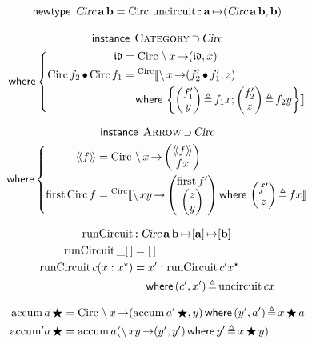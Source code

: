 \documentclass[a5paper,twoside,fleqn,draft]{jsbook}
\def\[{[\![}
\def\]{]\!]}
\newcommand{\Langle}{\langle\!\langle}
\newcommand{\Rangle}{\rangle\!\rangle}
\newcommand{\mKeyword}[1]{\mathsf{#1}}
\newcommand{\mInstanceDeclKeyword}{\mKeyword{instance}}
\newcommand{\mNewTypeDeclKeyword}{\mKeyword{newtype}}
\newcommand{\mWhereKeyword}{\mKeyword{where}}
\DeclareMathOperator{\mInstanceDecl}{\mInstanceDeclKeyword}
\DeclareMathOperator{\mNewTypeDecl}{\mNewTypeDeclKeyword}
\DeclareMathOperator{\mSuperSet}{\supset}
\DeclareMathOperator{\mWhere}{\mWhereKeyword}
\newcommand{\mEmptyList}{{[\,]}}
\newcommand{\mVarSpecialFunc}[1]{\mathfrak{#1}}
\DeclareMathOperator{\mIdCat}{\mVarSpecialFunc{id}}
\DeclareMathOperator{\mBinOp}{\bigstar}
\DeclareMathOperator{\mCompCat}{\bullet}
\DeclareMathOperator{\mIn}{{:\!:}}
\DeclareMathOperator{\mLambda}{\backslash}
\DeclareMathOperator{\mLambdaArrow}{\rightarrow}
\DeclareMathOperator{\mLetEq}{\triangleq}
\DeclareMathOperator{\mMapsTo}{\mapsto}
\newcommand{\mType}[1]{\mathbf{#1}} %
\newcommand{\mA}{\mType{a}}
\newcommand{\mB}{\mType{b}}
\newcommand{\mArrowWith}[1]{\Langle#1\Rangle}
\newcommand{\mPairWith}[2]{\begin{pmatrix}#1\\#2\end{pmatrix}}
\newcommand{\mTypeClass}[1]{\textsc{#1}} %
\newcommand{\mList}[1]{{#1}^\mathrm{\star}}
\begin{document}
\begin{equation}
  \mNewTypeDecl\;
  \mCircuitType\,\mA\,\mB
  =\mCircuitWith{\mUncircuit\mIn\mA\mMapsTo(\mCircuitType\,\mA\,\mB,\mB)}
\end{equation}

\begin{multline}
  \mInstanceDecl\;
  \mTypeClass{Category}\mSuperSet\mCircuitType\\
  \mWhere
  \left\{
  \begin{aligned}
    \mIdCat
    &=\mCircuitWith{\mLambda x\mLambdaArrow(\mIdCat,x)}\\
    \mCircuitWith{f_2}\mCompCat\mCircuitWith{f_1}
    &={}^{\textrm{Circ}}\[\mLambda x\mLambdaArrow(f_2'\mCompCat f_1',z)\\
    &\quad\mWhere{}\left\{
    \mPairWith{f_1'}{y}\mLetEq f_1x;
    \mPairWith{f_2'}{z}\mLetEq f_2y\right\}\]
  \end{aligned}
  \right.
\end{multline}

\begin{multline}
  \mInstanceDecl\;
  \mTypeClass{Arrow}\mSuperSet\mCircuitType\\
  \mWhere\left\{
  \begin{aligned}
    \mArrowWith{f}
    &=\mCircuitWith{\mLambda x\mLambdaArrow\mPairWith{\mArrowWith{f}}{fx}}\\
    \mFirstFunc\mCircuitWith{f}
    &={}^{\mathrm{Circ}}\[\mLambda xy\mLambdaArrow\mPairWith{\mFirstFunc f'}{\mPairWith{z}{y}}
    \mWhere{}\mPairWith{f'}{z}\mLetEq fx\]
  \end{aligned}
  \right.
\end{multline}

\newcommand{\mRunCircuit}{\mathop{\mathrm{runCircuit}}}

\begin{align}
  \mRunCircuit&\mIn\mCircuitType\,\mA\,\mB\mMapsTo[\mA]\mMapsTo[\mB]\\
  \mRunCircuit\_\mEmptyList&=\mEmptyList\\
  \mRunCircuit c(x:\mList{x})&=x':\mRunCircuit c'\mList{x}\\
  &\quad\mWhere{}(c',x')\mLetEq\mUncircuit cx
\end{align}

\newcommand{\mAccum}{\mathop{\mathrm{accum}}}

\begin{align}
  \mAccum a\mBinOp
  &=\mCircuitWith{\mLambda x\mLambdaArrow(\mAccum a'\mBinOp,y)
    \mWhere{}(y',a')\mLetEq x\mBinOp a}\\
  {\mAccum}' a\mBinOp
  &=\mAccum a(\mLambda xy\mLambdaArrow(y',y')
  \mWhere y'\mLetEq x\mBinOp y)
\end{align}
\end{document}

